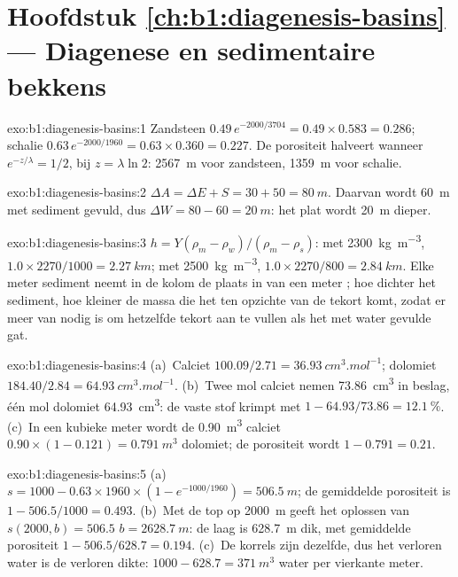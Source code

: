 \section*{Hoofdstuk \ref{ch:b1:diagenesis-basins} --- Diagenese en sedimentaire bekkens}

\begin{solution}{exo:b1:diagenesis-basins:1}
Zandsteen $0.49\,e^{-2000/3704} = 0.49\times0.583 = \num{0.286}$; schalie
$0.63\,e^{-2000/1960} = 0.63\times0.360 = \num{0.227}$. De porositeit halveert wanneer
$e^{-z/\lambda} = 1/2$, bij $z = \lambda\ln 2$: \qty{2567}{m} voor zandsteen,
\qty{1359}{m} voor schalie.
\end{solution}

\begin{solution}{exo:b1:diagenesis-basins:2}
$\Delta A = \Delta E + S = 30 + 50 = \qty{80}{m}$. Daarvan wordt \qty{60}{m} met sediment
gevuld, dus $\Delta W = 80 - 60 = \qty{20}{m}$: het plat wordt \qty{20}{m} dieper.
\end{solution}

\begin{solution}{exo:b1:diagenesis-basins:3}
$h = Y(\rho_m - \rho_w)/(\rho_m - \rho_s)$: met \qty{2300}{kg.m^{-3}},
$1.0\times2270/1000 = \qty{2.27}{km}$; met \qty{2500}{kg.m^{-3}},
$1.0\times2270/800 = \qty{2.84}{km}$. Elke meter sediment neemt in de kolom de plaats in van een meter
; hoe dichter het sediment, hoe kleiner de massa die het ten opzichte van de  tekort komt,
zodat er meer van nodig is om hetzelfde tekort aan te vullen als het met water gevulde gat.
\end{solution}

\begin{solution}{exo:b1:diagenesis-basins:4}
(a)~Calciet $100.09/2.71 = \qty{36.93}{cm^3.mol^{-1}}$; dolomiet $184.40/2.84
= \qty{64.93}{cm^3.mol^{-1}}$. (b)~Twee mol calciet nemen
\qty{73.86}{cm^3} in beslag, één mol dolomiet \qty{64.93}{cm^3}: de vaste stof krimpt met
$1 - 64.93/73.86 = \qty{12.1}{\%}$. (c)~In een kubieke meter wordt de
\qty{0.90}{m^3} calciet $0.90\times(1 - 0.121) = \qty{0.791}{m^3}$ dolomiet; de
porositeit wordt $1 - 0.791 = \num{0.21}$.
\end{solution}

\begin{solution}{exo:b1:diagenesis-basins:5}
(a)~$s = 1000 - 0.63\times1960\times(1 - e^{-1000/1960}) = \qty{506.5}{m}$; de
gemiddelde porositeit is $1 - 506.5/1000 = \num{0.493}$. (b)~Met de top op
\qty{2000}{m} geeft het oplossen van $s(2000, b) = 506.5$ $b = \qty{2628.7}{m}$: de
laag is \qty{628.7}{m} dik, met gemiddelde porositeit $1 - 506.5/628.7 = \num{0.194}$.
(c)~De korrels zijn dezelfde, dus het verloren water is de verloren dikte:
$1000 - 628.7 = \qty{371}{m^3}$ water per vierkante meter.
\end{solution}

